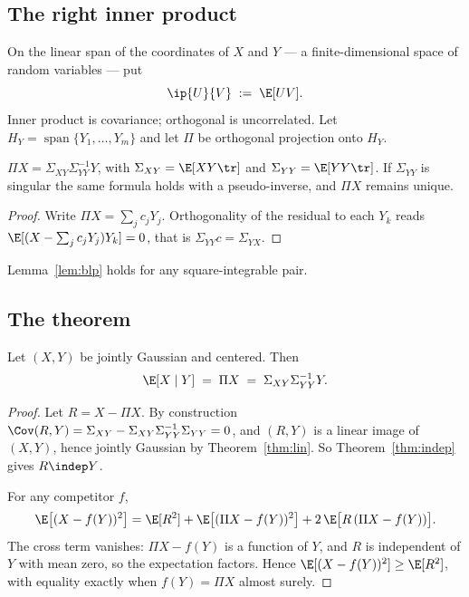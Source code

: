\documentclass[11pt]{article}
\begin{document}
\subsection{The right inner product}

On the linear span of the coordinates of $X$ and $Y$ --- a finite-dimensional space of random variables --- put
\[
\ip{U}{V}\;:=\;\E[UV].
\]
Inner product is covariance; orthogonal is uncorrelated. Let $H_Y=\operatorname{span}\{Y_1,\dots,Y_m\}$ and let $\Pi$ be orthogonal projection onto $H_Y$.

\begin{lemma}\label{lem:blp}
$\Pi X=\Sigma_{XY}\Sigma_{YY}^{-1}Y$, with $\Sigma_{XY}=\E[XY\tr]$ and $\Sigma_{YY}=\E[YY\tr]$. If $\Sigma_{YY}$ is singular the same formula holds with a pseudo-inverse, and $\Pi X$ remains unique.
\end{lemma}

\begin{proof}
Write $\Pi X=\sum_j c_jY_j$. Orthogonality of the residual to each $Y_k$ reads $\E[(X-\sum_j c_jY_j)Y_k]=0$, that is $\Sigma_{YY}c=\Sigma_{YX}$.
\end{proof}

Lemma~\ref{lem:blp} holds for any square-integrable pair.

\subsection{The theorem}

\begin{theorem}\label{thm:proj}
Let $(X,Y)$ be jointly Gaussian and centered. Then
\[
\E[X\mid Y]\;=\;\Pi X\;=\;\Sigma_{XY}\Sigma_{YY}^{-1}Y .
\]
\end{theorem}

\begin{proof}
Let $R=X-\Pi X$. By construction $\Cov(R,Y)=\Sigma_{XY}-\Sigma_{XY}\Sigma_{YY}^{-1}\Sigma_{YY}=0$, and $(R,Y)$ is a linear image of $(X,Y)$, hence jointly Gaussian by Theorem~\ref{thm:lin}. So Theorem~\ref{thm:indep} gives $R\indep Y$.

For any competitor $f$,
\[
\E\big[(X-f(Y))^2\big]=\E[R^2]+\E\big[(\Pi X-f(Y))^2\big]+2\,\E\big[R\,(\Pi X-f(Y))\big].
\]
The cross term vanishes: $\Pi X-f(Y)$ is a function of $Y$, and $R$ is independent of $Y$ with mean zero, so the expectation factors. Hence $\E[(X-f(Y))^2]\ge\E[R^2]$, with equality exactly when $f(Y)=\Pi X$ almost surely.
\end{proof}
\end{document}
